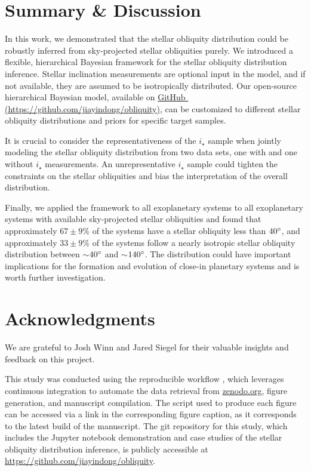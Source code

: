 \documentclass[twocolumn,times]{aastex631}
\begin{document}
\section{Summary \& Discussion}

In this work, we demonstrated that the stellar obliquity distribution could be robustly inferred from sky-projected stellar obliquities purely.
We introduced a flexible, hierarchical Bayesian framework for the stellar obliquity distribution inference. Stellar inclination measurements are optional input in the model, and if not available, they are assumed to be isotropically distributed.
Our open-source hierarchical Bayesian model, available on \href{https://github.com/jiayindong/obliquity}{GitHub\,\faGithub\,(https://github.com/jiayindong/obliquity)}, can be customized to different stellar obliquity distributions and priors for specific target samples.

It is crucial to consider the representativeness of the $i_\star$ sample when jointly modeling the stellar obliquity distribution from two data sets, one with and one without $i_\star$ measurements. An unrepresentative $i_\star$ sample could tighten the constraints on the stellar obliquities and bias the interpretation of the overall distribution.

Finally, we applied the framework to all exoplanetary systems to all exoplanetary systems with available sky-projected stellar obliquities and found that approximately $67\pm9$\% of the systems have a stellar obliquity less than $40\mbox{$^\circ$}$, and approximately $33\pm9$\% of the systems follow a nearly isotropic stellar obliquity distribution between $\sim$$40\mbox{$^\circ$}$ and $\sim$$140\mbox{$^\circ$}$.
The distribution could have important implications for the formation and evolution of close-in planetary systems and is worth further investigation.

\section*{Acknowledgments}
We are grateful to Josh Winn and Jared Siegel for their valuable insights and feedback on this project.

This study was conducted using the \href{https://github.com/showyourwork/showyourwork}{\showyourwork} reproducible workflow \citep{Luger2021}, which leverages continuous integration to automate the data retrieval from \href{https://zenodo.org/}{zenodo.org}, figure generation, and manuscript compilation.
The script used to produce each figure can be accessed via a link in the corresponding figure caption, as it corresponds to the latest build of the manuscript.
The git repository for this study, which includes the Jupyter notebook demonstration and case studies of the stellar obliquity distribution inference, is publicly accessible at \url{https://github.com/jiayindong/obliquity}.
\end{document}
